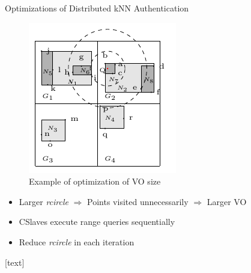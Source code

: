 \documentclass[xcolor={dvipsnames},aspectratio=169,10pt]{beamer}
\begin{document}
\begin{frame}{Optimizations of Distributed kNN Authentication}
  \begin{figure}
    \includegraphics[height=0.4\textheight]{figs/knn/optimize.pdf}
    \caption{Example of optimization of VO size}
  \end{figure}

  \begin{itemize}
    \item Larger \emph{rcircle} $\Rightarrow$ Points visited unnecessarily $\Rightarrow$ Larger VO
    \item CSlaves execute range queries \alert{sequentially}
    \item Reduce \emph{rcircle} in each iteration
  \end{itemize}
\end{frame}

\begingroup
{}
\begin{frame}[t,allowframebreaks]{\refname}
  [text]
  \renewcommand*{\bibfont}{\scriptsize}
  \printbibliography[heading=none]%
\end{frame}
\endgroup
\end{document}
